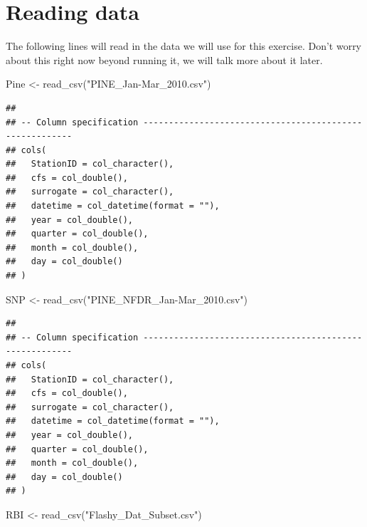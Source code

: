 \documentclass[
]{book}
\newenvironment{Shaded}{\begin{snugshade}}{\end{snugshade}}
\newcommand{\FunctionTok}[1]{\textcolor[rgb]{0.00,0.00,0.00}{#1}}
\newcommand{\NormalTok}[1]{#1}
\newcommand{\OtherTok}[1]{\textcolor[rgb]{0.56,0.35,0.01}{#1}}
\newcommand{\StringTok}[1]{\textcolor[rgb]{0.31,0.60,0.02}{#1}}
\begin{document}
\hypertarget{reading-data}{%
\section{Reading data}\label{reading-data}}

The following lines will read in the data we will use for this exercise. Don't worry about this right now beyond running it, we will talk more about it later.

\begin{Shaded}
\begin{Highlighting}[]
\NormalTok{Pine }\OtherTok{\textless{}{-}} \FunctionTok{read\_csv}\NormalTok{(}\StringTok{"PINE\_Jan{-}Mar\_2010.csv"}\NormalTok{) }
\end{Highlighting}
\end{Shaded}

\begin{verbatim}
## 
## -- Column specification --------------------------------------------------------
## cols(
##   StationID = col_character(),
##   cfs = col_double(),
##   surrogate = col_character(),
##   datetime = col_datetime(format = ""),
##   year = col_double(),
##   quarter = col_double(),
##   month = col_double(),
##   day = col_double()
## )
\end{verbatim}

\begin{Shaded}
\begin{Highlighting}[]
\NormalTok{SNP }\OtherTok{\textless{}{-}} \FunctionTok{read\_csv}\NormalTok{(}\StringTok{"PINE\_NFDR\_Jan{-}Mar\_2010.csv"}\NormalTok{)}
\end{Highlighting}
\end{Shaded}

\begin{verbatim}
## 
## -- Column specification --------------------------------------------------------
## cols(
##   StationID = col_character(),
##   cfs = col_double(),
##   surrogate = col_character(),
##   datetime = col_datetime(format = ""),
##   year = col_double(),
##   quarter = col_double(),
##   month = col_double(),
##   day = col_double()
## )
\end{verbatim}

\begin{Shaded}
\begin{Highlighting}[]
\NormalTok{RBI }\OtherTok{\textless{}{-}} \FunctionTok{read\_csv}\NormalTok{(}\StringTok{"Flashy\_Dat\_Subset.csv"}\NormalTok{)}
\end{Highlighting}
\end{Shaded}
\end{document}

